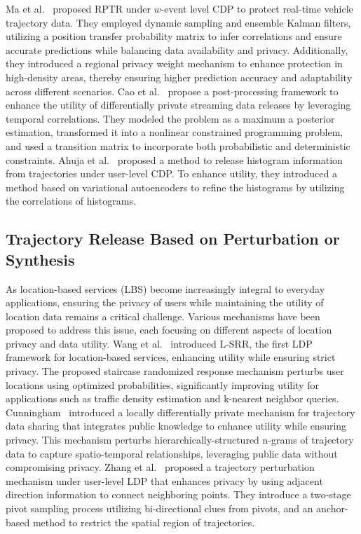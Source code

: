 Ma et al.~\cite{ma2019real} proposed RPTR under $w$-event level CDP to protect real-time vehicle trajectory data. They employed dynamic sampling and ensemble Kalman filters, utilizing a position transfer probability matrix to infer correlations and ensure accurate predictions while balancing data availability and privacy. Additionally, they introduced a regional privacy weight mechanism to enhance protection in high-density areas, thereby ensuring higher prediction accuracy and adaptability across different scenarios.
Cao et al.~\cite{cao2023differentially} propose a post-processing framework to enhance the utility of differentially private streaming data releases by leveraging temporal correlations. They modeled the problem as a maximum a posterior estimation, transformed it into a nonlinear constrained programming problem, and used a transition matrix to incorporate both probabilistic and deterministic constraints.
Ahuja et al.~\cite{ahuja2023neural} proposed a method to release histogram information from trajectories under user-level CDP. To enhance utility, they introduced a method based on variational autoencoders to refine the histograms by utilizing the correlations of histograms.

\subsection{Trajectory Release Based on Perturbation or Synthesis}
 
As location-based services (LBS) become increasingly integral to everyday applications, ensuring the privacy of users while maintaining the utility of location data remains a critical challenge. Various mechanisms have been proposed to address this issue, each focusing on different aspects of location privacy and data utility. 
Wang et al.~\cite{wang2022srr} introduced L-SRR, the first LDP framework for location-based services, enhancing utility while ensuring strict privacy. The proposed staircase randomized response mechanism perturbs user locations using optimized probabilities, significantly improving utility for applications such as traffic density estimation and k-nearest neighbor queries.
Cunningham~\cite{cunningham2021real} introduced a locally differentially private mechanism for trajectory data sharing that integrates public knowledge to enhance utility while ensuring privacy. This mechanism perturbs hierarchically-structured n-grams of trajectory data to capture spatio-temporal relationships, leveraging public data without compromising privacy. 
Zhang et al.~\cite{zhang2023trajectory} proposed a trajectory perturbation mechanism under user-level LDP that enhances privacy by using adjacent direction information to connect neighboring points. They introduce a two-stage pivot sampling process utilizing bi-directional clues from pivots, and an anchor-based method to restrict the spatial region of trajectories.

